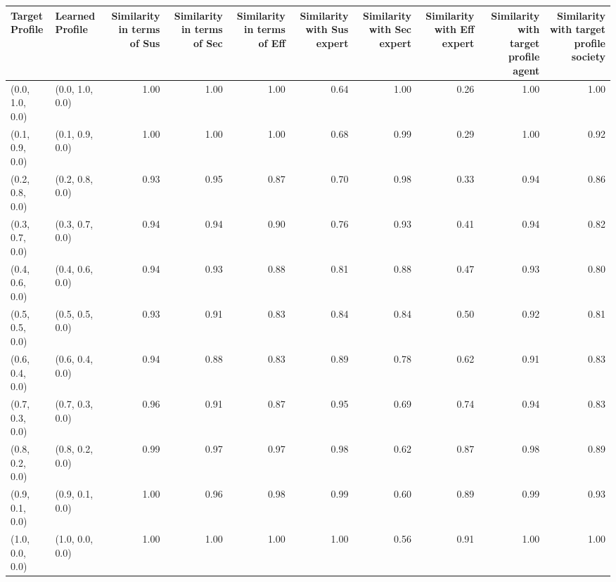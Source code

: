 \begin{tabular}{llrrrrrrrr}
\toprule
Target Profile & Learned Profile & Similarity in terms of Sus & Similarity in terms of Sec & Similarity in terms of Eff & Similarity with Sus expert & Similarity with Sec expert & Similarity with Eff expert & Similarity with target profile agent & Similarity with target profile society \\
\midrule
(0.0, 1.0, 0.0) & (0.0, 1.0, 0.0) & 1.00 & 1.00 & 1.00 & 0.64 & 1.00 & 0.26 & 1.00 & 1.00 \\
(0.1, 0.9, 0.0) & (0.1, 0.9, 0.0) & 1.00 & 1.00 & 1.00 & 0.68 & 0.99 & 0.29 & 1.00 & 0.92 \\
(0.2, 0.8, 0.0) & (0.2, 0.8, 0.0) & 0.93 & 0.95 & 0.87 & 0.70 & 0.98 & 0.33 & 0.94 & 0.86 \\
(0.3, 0.7, 0.0) & (0.3, 0.7, 0.0) & 0.94 & 0.94 & 0.90 & 0.76 & 0.93 & 0.41 & 0.94 & 0.82 \\
(0.4, 0.6, 0.0) & (0.4, 0.6, 0.0) & 0.94 & 0.93 & 0.88 & 0.81 & 0.88 & 0.47 & 0.93 & 0.80 \\
(0.5, 0.5, 0.0) & (0.5, 0.5, 0.0) & 0.93 & 0.91 & 0.83 & 0.84 & 0.84 & 0.50 & 0.92 & 0.81 \\
(0.6, 0.4, 0.0) & (0.6, 0.4, 0.0) & 0.94 & 0.88 & 0.83 & 0.89 & 0.78 & 0.62 & 0.91 & 0.83 \\
(0.7, 0.3, 0.0) & (0.7, 0.3, 0.0) & 0.96 & 0.91 & 0.87 & 0.95 & 0.69 & 0.74 & 0.94 & 0.83 \\
(0.8, 0.2, 0.0) & (0.8, 0.2, 0.0) & 0.99 & 0.97 & 0.97 & 0.98 & 0.62 & 0.87 & 0.98 & 0.89 \\
(0.9, 0.1, 0.0) & (0.9, 0.1, 0.0) & 1.00 & 0.96 & 0.98 & 0.99 & 0.60 & 0.89 & 0.99 & 0.93 \\
(1.0, 0.0, 0.0) & (1.0, 0.0, 0.0) & 1.00 & 1.00 & 1.00 & 1.00 & 0.56 & 0.91 & 1.00 & 1.00 \\
\bottomrule
\end{tabular}
